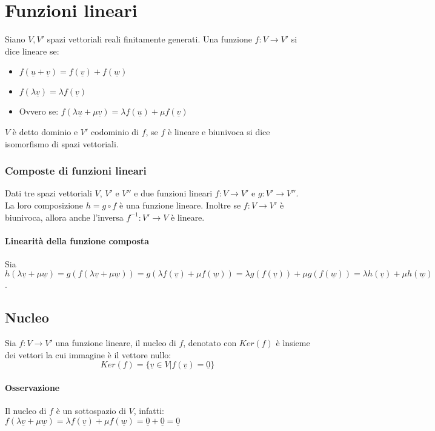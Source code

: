 \chapter{Funzioni lineari}
Siano $V,V'$ spazi vettoriali reali finitamente generati. Una funzione $f:V\rightarrow V'$ si dice lineare se:
\begin{itemize}
\item $f(\underline{u}+\underline{v})=f(\underline{v})+f(\underline{w})$
\item $f(\lambda\underline{v})=\lambda f(\underline{v})$
\item Ovvero se: $f(\lambda\underline{u}+\mu\underline{v})=\lambda f(\underline{u})+\mu f(\underline{v})$  
\end{itemize}
$V$ \`e detto dominio e $V'$ codominio di $f$, se $f$ \`e lineare e biunivoca si dice isomorfismo di spazi vettoriali.
\subsection{Composte di funzioni lineari}
Dati tre spazi vettoriali $V$, $V'$ e $V''$ e due funzioni lineari $f:V\rightarrow V'$ e $g:V'\rightarrow V''$. La loro composizione $h=g\circ f$ \`e una funzione lineare. Inoltre
se $f:V\rightarrow V'$ \`e biunivoca, allora anche l'inversa $f^{-1}:V'\rightarrow V$ \`e lineare.
\subsubsection{Linearit\`a della funzione composta}
Sia $h(\lambda\underline{v}+\mu\underline{w})=g(f(\lambda\underline{v}+\mu\underline{w}))=g(\lambda f(\underline{v})+\mu f(\underline{w}))=\lambda g(f(\underline{v}))+\mu 
g(f(\underline{w}))=\lambda h(\underline{v})+\mu h(\underline{w})$.
\section{Nucleo}
Sia $f:V\rightarrow V'$ una funzione lineare, il nucleo di $f$, denotato con $Ker(f)$ \`e \`insieme dei vettori la cui immagine \`e il vettore nullo:
\begin{equation}
Ker(f)=\{\underline{v}\in V|f(\underline{v})=\underline{0}\}
\end{equation}
\subsubsection{Osservazione}
Il nucleo di $f$ \`e un sottospazio di $V$, infatti: $f(\lambda\underline{v}+\mu\underline{w})=\lambda f(\underline{v})+\mu f(\underline{w})=\underline{0}+\underline{0}=
\underline{0}$
